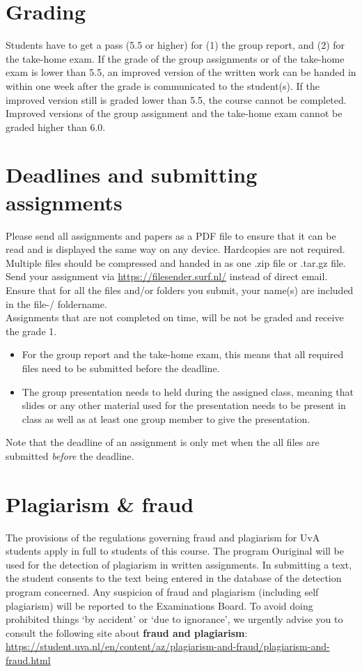 \documentclass[a4paper,10pt,twocolumn]{report}
\begin{document}
	\section{Grading}
	Students have to get a pass (5.5 or higher) for (1) the group report, and (2) for the take-home exam. If the grade of the group assignments or of the take-home exam is lower than 5.5, an improved version of the written work can be handed in within one week after the grade is communicated to the student(s). If the improved version still is graded lower than 5.5, the course cannot be completed. Improved versions of the group assignment and the take-home exam cannot be graded higher than 6.0. 
	
	\section{Deadlines and submitting assignments}
	Please send all assignments and papers as a PDF file to ensure that it can be read and is displayed the same way on any device. Hardcopies are not required. Multiple files should be compressed and handed in as one .zip file or .tar.gz file. Send your assignment via \url{https://filesender.surf.nl/} instead of direct email. Ensure that for all the files and/or folders you submit, your name(s) are included in the file-/ foldername. \\
	
	Assignments that are not completed on time, will be not be graded and receive the grade 1. 
		\begin{itemize}
			\item For the group report and the take-home exam, this means that all required files need to be submitted before the deadline. 
			\item The group presentation needs to held during the assigned class, meaning that slides or any other material used for the presentation needs to be present in class as well as at least one group member to give the presentation. 
		\end{itemize}
	Note that the deadline of an assignment is only met when the all files are submitted \emph{before} the deadline.

	\section{Plagiarism \& fraud}
	The provisions of the regulations governing fraud and plagiarism for UvA students apply in full to students of this course. The program Ouriginal will be used for the detection of plagiarism in written assignments. In submitting a text, the student consents to the text being entered in the database of the detection program concerned. Any suspicion of fraud and plagiarism (including self plagiarism) will be reported to the Examinations Board. To avoid doing prohibited things ‘by accident’ or ‘due to ignorance’, we urgently advise you to consult the following site about \textbf{fraud and plagiarism}: \url{https://student.uva.nl/en/content/az/plagiarism-and-fraud/plagiarism-and-fraud.html}
	
\end{document}
